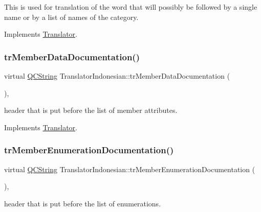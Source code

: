 This is used for translation of the word that will possibly be followed by a single name or by a list of names of the category. 

Implements \mbox{\hyperlink{class_translator}{Translator}}.

\mbox{\label{class_translator_indonesian_a7ca79aaaac3b58234649202c5c92bb97}} 
\subsubsection{\texorpdfstring{trMemberDataDocumentation()}{trMemberDataDocumentation()}}
{\footnotesize\ttfamily virtual \mbox{\hyperlink{class_q_c_string}{Q\+C\+String}} Translator\+Indonesian\+::tr\+Member\+Data\+Documentation (\begin{DoxyParamCaption}{ }\end{DoxyParamCaption})\hspace{0.3cm}{\ttfamily [inline]}, {\ttfamily [virtual]}}

header that is put before the list of member attributes. 

Implements \mbox{\hyperlink{class_translator}{Translator}}.

\mbox{\label{class_translator_indonesian_a1446646ff37c0e286755bc8f78e24f98}} 
\subsubsection{\texorpdfstring{trMemberEnumerationDocumentation()}{trMemberEnumerationDocumentation()}}
{\footnotesize\ttfamily virtual \mbox{\hyperlink{class_q_c_string}{Q\+C\+String}} Translator\+Indonesian\+::tr\+Member\+Enumeration\+Documentation (\begin{DoxyParamCaption}{ }\end{DoxyParamCaption})\hspace{0.3cm}{\ttfamily [inline]}, {\ttfamily [virtual]}}

header that is put before the list of enumerations. 


